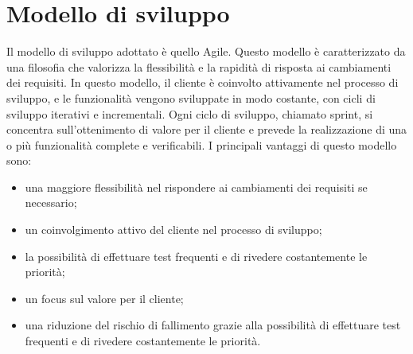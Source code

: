 \section{Modello di sviluppo}
Il modello di sviluppo adottato è quello Agile. Questo modello è caratterizzato da una filosofia che valorizza la flessibilità e la rapidità
di risposta ai cambiamenti dei requisiti. In questo modello, il cliente è coinvolto attivamente
nel processo di sviluppo, e le funzionalità vengono sviluppate in modo costante, con cicli di sviluppo
iterativi e incrementali. Ogni ciclo di sviluppo, chiamato sprint, si concentra sull'ottenimento
di valore per il cliente e prevede la realizzazione di una o più funzionalità complete e verificabili.
I principali vantaggi di questo modello sono:
\begin{itemize}
    \item una maggiore flessibilità nel rispondere ai cambiamenti dei requisiti se necessario;
    \item un coinvolgimento attivo del cliente nel processo di sviluppo;
    \item la possibilità di effettuare test frequenti e di rivedere costantemente le priorità;
    \item un focus sul valore per il cliente;
    \item una riduzione del rischio di fallimento grazie alla possibilità di effettuare test frequenti e di rivedere costantemente le priorità.
\end{itemize}
